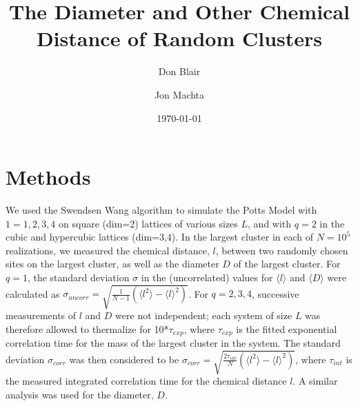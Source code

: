 \documentclass[pre,preprint]{revtex4}
\newcommand{\lb}{{\langle}}
\newcommand{\rb}{{\rangle}}
\begin{document}
\title{The Diameter and Other Chemical Distance of Random Clusters}

\author{Don Blair}
\author{Jon Machta}

\date{\today}




\section{Methods}

We used the Swendsen Wang algorithm to simulate the Potts Model with $1=1,2,3,4$ on square (dim=2) lattices of various sizes $L$, and with $q=2$ in the cubic and hypercubic lattices (dim=3,4). In the largest cluster in each of $N=10^5$ realizations, we measured the chemical distance, $l$, between two randomly chosen sites on the largest cluster, as well as the diameter $D$ of the largest cluster. For $q=1$, the standard deviation $\sigma$ in the (uncorrelated) values for $\lb l \rb$ and $\lb D \rb$ were calculated as $\sigma_{uncorr} = \sqrt{ \frac{1}{N-1} (\lb l^2 \rb - \lb l \rb^2)}$. For $q=2,3,4$, successive measurements of $l$ and $D$ were not independent; each system of size $L$ was therefore allowed to thermalize for 10*$\tau_{exp}$, where $\tau_{exp}$ is the fitted exponential correlation time for the mass of the largest cluster in the system.  The standard deviation $\sigma_{corr}$ was then considered to be $\sigma_{corr} = \sqrt{ \frac{2 \tau_{int}}{N} (\lb l^2 \rb - \lb l \rb^2)}$, where $\tau_{int}$ is the measured integrated correlation time for the chemical distance $l$.  A similar analysis was used for the diameter, $D$.
\end{document}
